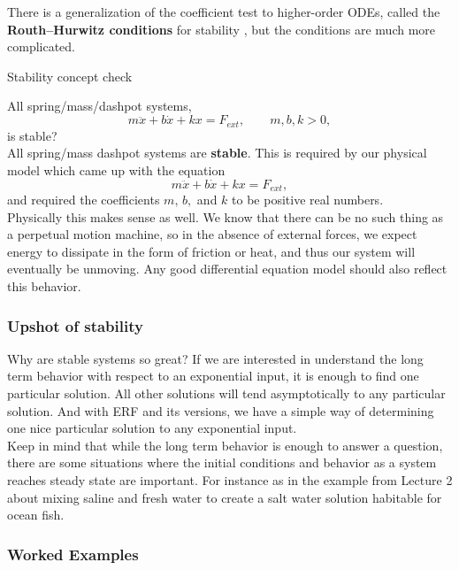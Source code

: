 \begin{remark}
  There is a generalization of the coefficient test to higher-order ODEs,
  called the \textbf{\color{blue}Routh–Hurwitz conditions} for stability ,
  but the conditions are much more complicated.
\end{remark}

\begin{exercise}
  Stability concept check
\end{exercise}
All spring/mass/dashpot systems,
\begin{equation*}
  m\ddot x + b\dot x + kx= F_{ext}, \qquad m, b, k > 0,
\end{equation*}
is stable?\\

All spring/mass dashpot systems are \textbf{stable}.
This is required by our physical model which came up with the equation
\begin{equation*}
  m\ddot x + b\dot x + kx= F_{ext},
\end{equation*}
and required the coefficients $m,\, b,$ and $k$  to be positive real numbers. \\
Physically this makes sense as well.
We know that there can be no such thing as a perpetual motion machine,
so in the absence of external forces,
we expect energy to dissipate in the form of friction or heat,
and thus our system will eventually be unmoving.
Any good differential equation model should also reflect this behavior.
\clearpage

\subsubsection{Upshot of stability}
Why are stable systems so great?
If we are interested in understand the long term behavior with respect to an exponential input,
it is enough to find one particular solution.
All other solutions will tend asymptotically to any particular solution.
And with ERF and its versions,
we have a simple way of determining one nice particular solution to any exponential input.\\

Keep in mind that while the long term behavior is enough to answer a question,
there are some situations where the initial conditions
and behavior as a system reaches steady state are important.
For instance as in the {\color{blue}example from Lecture 2}
about mixing saline and fresh water to create a salt water solution habitable for ocean fish.
\clearpage
\subsubsection{Worked Examples}
